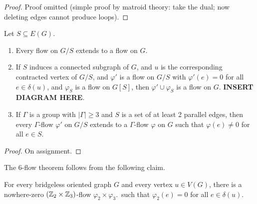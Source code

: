 \documentclass[main.tex]{subfiles}
\begin{document}
\begin{proof}
  Proof omitted (simple proof by matroid theory: take the dual; now deleting
  edges cannot produce loops).
\end{proof}\begin{proposition}
  Let $S\subseteq E(G)$.
  \begin{enumerate}[label=(\arabic*)]
    \item Every flow on $G/S$ extends to a flow on $G$.

    \item If $S$ induces a connected subgraph of $G$, and $u$ is the
      corresponding contracted vertex of $G/S$, and $\varphi'$ is a flow on
      $G/S$ with $\varphi'(e) = 0$ for all $e\in\delta(u)$, and $\varphi_S$ is a
      flow on $G[S]$, then $\varphi'\cup\varphi_S$ is a flow on $G$.
      \textbf{INSERT DIAGRAM HERE}.

    \item If $\Gamma$ is a group with $|\Gamma|\geq 3$ and $S$ is a set of
      at least 2 parallel edges, then every $\Gamma$-flow $\varphi'$ on $G/S$
      extends to a $\Gamma$-flow $\varphi$ on $G$ such that $\varphi(e)\neq 0$
      for all $e\in S$.
  \end{enumerate}
\end{proposition}
\begin{proof}
  On assignment.
\end{proof}
The 6-flow theorem follows from the following claim.
\begin{claim}
  For every bridgeless oriented graph $G$ and every vertex $u\in V(G)$,
  there is a nowhere-zero $(\mathbb Z_2\times\mathbb Z_3)$-flow $\varphi_2\times\varphi_3$.\
  such that $\varphi_2(e) = 0$ for all $e\in\delta(u)$.
\end{claim}
\end{document}
